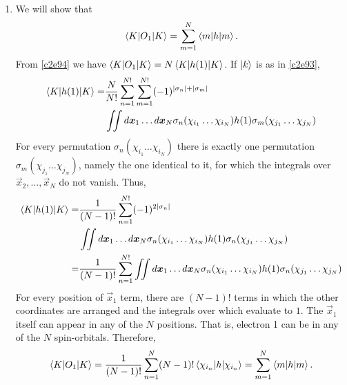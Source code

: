 \begin{enumerate}
\item\label{c2r3} We will show that
\begin{equation}\label{c2e95}
\braket{K|O_1|K} = \sum_{m=1}^N\braket{m|h|m}.
\end{equation}
From \eqref{c2e94} we have $\braket{K|O_1|K} = N\braket{K|h(1)|K}$. If $\ket{k}$
is as in \eqref{c2e93},
\[
\begin{aligned}
\braket{K|h(1)|K} =& \frac{N}{N!}\sum_{n=1}^{N!}\sum_{m=1}^{N!}(-1)^{|\sigma_n|+
|\sigma_m|} \\
 & \iint d\bm{x}_1\ldots d\bm{x}_N\sigma_n(\chi_{i_1}\ldots\chi_{i_N})h(1)
\sigma_m(\chi_{j_1}\ldots\chi_{j_N})
\end{aligned}
\]
For every permutation $\sigma_n(\chi_{i_1}\ldots\chi_{i_N})$ there is exactly
one permutation $\sigma_m(\chi_{j_1}\ldots\chi_{j_N})$, namely the one identical
to it, for which the integrals over $\vec{x}_2, \ldots, \vec{x}_N$ do not 
vanish. Thus,
\[
\begin{aligned}
\braket{K|h(1)|K} =& \frac{1}{(N-1)!}\sum_{n=1}^{N!}(-1)^{2|\sigma_n|} \\
 & \iint d\bm{x}_1\ldots d\bm{x}_N\sigma_n(\chi_{i_1}\ldots\chi_{i_N})h(1)
\sigma_n(\chi_{j_1}\ldots\chi_{j_N}) \\
 =& \frac{1}{(N-1)!}\sum_{n=1}^{N!}
 \iint d\bm{x}_1\ldots d\bm{x}_N\sigma_n(\chi_{i_1}\ldots\chi_{i_N})h(1)
\sigma_n(\chi_{j_1}\ldots\chi_{j_N}) \\
 \end{aligned}
\]
For every position of $\vec{x}_1$ term, there are $(N-1)!$ terms in which the
other coordinates are arranged and the integrals over which evaluate to $1$.
The $\vec{x}_1$ itself can appear in any of the $N$ positions. That is, electron
1 can be in any of the $N$ spin-orbitals. Therefore, 
\[
\braket{K|O_1|K} = \frac{1}{(N-1)!}\sum_{n=1}^N(N-1)!\braket{\chi_{i_n}|h|
\chi_{i_n}} = \sum_{m=1}^N\braket{m|h|m}.
\]


\end{enumerate}
